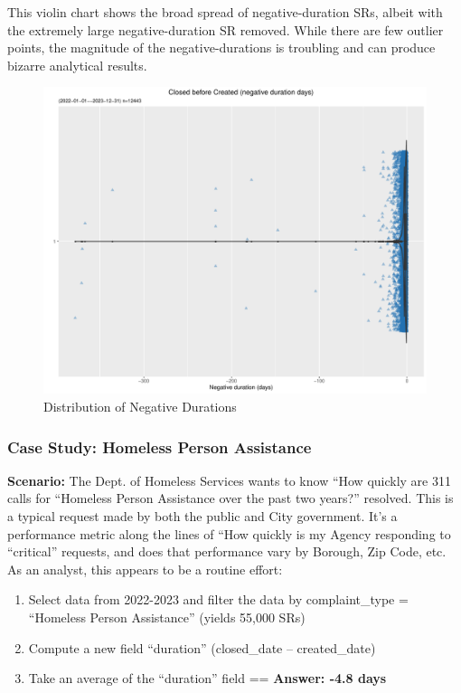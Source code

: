 \documentclass[12pt, titlepage]{article}
\begin{document}
{This violin chart shows the broad spread of negative-duration SRs, albeit with 
the extremely large negative-duration SR removed. While there are few 
outlier points, the magnitude of the negative-durations is troubling and can 
produce bizarre analytical results.

\begin{figure}[tbp]
 	 \centering
 	 \includegraphics[width = \textwidth]{negative_duration_SR_violin.pdf}
	 \caption{Distribution of Negative Durations}
	 \label{fig:negative-duration-violin}
\end{figure}



\subsubsection{Case Study: Homeless Person Assistance}
		\textbf{Scenario:} The Dept. of Homeless Services wants to 
		know ``How quickly are 311 calls for ``Homeless Person Assistance 
		over the past two years?'' resolved. This is a typical request made by 
		both the public and City government. It's a performance metric along 
		the lines of ``How quickly is my Agency responding to ``critical'' 
		requests, and does that performance vary by Borough, Zip Code, etc. 
		As an analyst, this appears to be a routine effort: 
		
		\begin{enumerate}
		    \item Select data from 2022-2023 and filter the data by 
		    complaint\_type = ``Homeless Person Assistance'' (yields 55,000 SRs)
		    \item Compute a new field ``duration'' (closed\_date – created\_date)
		    \item Take an average of the ``duration'' field == \textbf{Answer:  -4.8 days}  
		\end{enumerate}
		
}
\end{document}
